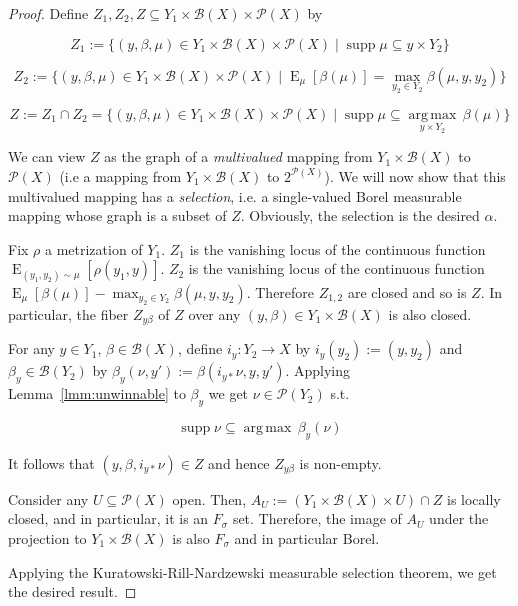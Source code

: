 \documentclass[aop,preprint]{imsart}
\numberwithin{equation}{section}
\theoremstyle{definition}
\theoremstyle{plain}
\newcommand{\Argmax}[1]{\underset{#1}{\operatorname{arg\,max}}\,}
\DeclareMathOperator{\E}{E}
\newcommand{\PM}{\mathcal{P}}
\DeclareMathOperator{\Sp}{supp}
\newcommand{\Gm}{\mathcal{B}}
\begin{document}
\begin{proof}

Define ${Z_1, Z_2, Z \subseteq Y_1 \times \Gm\left(X\right) \times \PM\left(X\right)}$ by

$${Z_1:=\{\left(y,\beta,\mu\right) \in Y_1 \times \Gm\left(X\right) \times \PM\left(X\right) \mid \Sp \mu \subseteq y \times Y_2\}}$$

$${Z_2:=\{\left(y,\beta,\mu\right) \in Y_1 \times \Gm\left(X\right) \times \PM\left(X\right) \mid \E_\mu\left[\beta\left(\mu\right)\right] = \max_{y_2 \in Y_2} \beta\left(\mu,y,y_2\right)\}}$$

$${Z:=Z_1 \cap Z_2 =\{\left(y,\beta,\mu\right) \in Y_1 \times \Gm\left(X\right) \times \PM\left(X\right) \mid \Sp \mu \subseteq \Argmax{y \times Y_2} \beta\left(\mu\right)\}}$$

We can view ${Z}$ as the graph of a \emph{multivalued} mapping from ${Y_1 \times \Gm\left(X\right)}$ to ${\PM\left(X\right)}$ (i.e a mapping from ${Y_1 \times \Gm\left(X\right)}$ to $2^{\PM\left(X\right)}$). We will now show that this multivalued mapping has a \emph{selection}, i.e. a single-valued Borel measurable mapping whose graph is a subset of $Z$. Obviously, the selection is the desired ${\alpha}$.

Fix $\rho$ a metrization of $Y_1$. $Z_1$ is the vanishing locus of the continuous function $\E_{\left(y_1, y_2\right) \sim \mu}\left[\rho\left(y_1,y\right)\right]$. $Z_2$ is the vanishing locus of the continuous function $\E_\mu\left[\beta\left(\mu\right)\right] - \max_{y_2 \in Y_2} \beta\left(\mu,y,y_2\right)$. Therefore $Z_{1,2}$ are closed and so is $Z$. In particular, the fiber ${Z_{y\beta}}$ of ${Z}$ over any ${\left(y,\beta\right) \in Y_1 \times \Gm\left(X\right)}$ is also closed. 

For any ${y \in Y_1}$, ${\beta \in \Gm\left(X\right)}$, define ${i_y: Y_2 \rightarrow X}$ by ${i_y\left(y_2\right):=\left(y,y_2\right)}$ and ${\beta_y \in \Gm\left(Y_{2}\right)}$ by $\beta_y\left(\nu,y'\right):=\beta\left(i_{y*}\nu,y,y'\right)$. Applying Lemma~\ref{lmm:unwinnable} to ${\beta_y}$ we get ${\nu \in \PM\left(Y_2\right)}$ s.t.

$$\Sp \nu \subseteq \Argmax{} \beta_y\left(\nu\right)$$

It follows that ${\left(y,\beta,i_{y*}\nu\right) \in Z}$ and hence ${Z_{y\beta}}$ is non-empty.

Consider any ${U \subseteq \PM\left(X\right)}$ open. Then, ${A_U:=\left(Y_{1} \times \Gm\left(X\right) \times U\right) \cap Z}$ is locally closed, and in particular, it is an ${F_\sigma}$ set. Therefore, the image of ${A_U}$ under the projection to ${Y_{1} \times \Gm\left(X\right)}$ is also ${F_\sigma}$ and in particular Borel. 

Applying the Kuratowski-Rill-Nardzewski measurable selection theorem, we get the desired result.
\end{proof}
\end{document}
